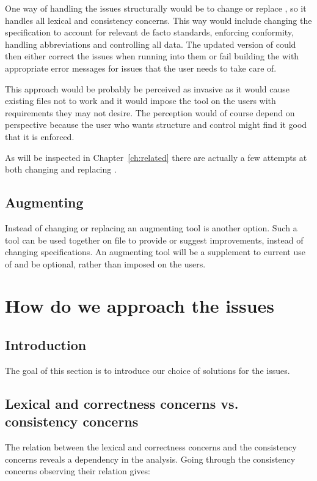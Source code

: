 One way of handling the issues structurally would be to change or
replace {\bibtex}, so it handles all lexical and consistency concerns.
This way would include changing the {\bibtex} specification to account
for relevant de facto standards, enforcing conformity, handling
abbreviations and controlling all data.  The updated version of
{\bibtex} could then either correct the issues when running into them
or fail building the  with appropriate error messages for
issues that the user needs to take care of.

This approach would be probably be perceived as invasive as it would
cause existing {\bibtex} files not to work and it would impose the
tool on the users with requirements they may not desire.  The
perception would of course depend on perspective because the user who
wants structure and control might find it good that it is enforced.

As will be inspected in Chapter~\ref{ch:related} there are actually a
few attempts at both changing and replacing {\bibtex}.


\subsection{Augmenting {\bibtex}}

Instead of changing or replacing {\bibtex} an augmenting tool is
another option.  Such a tool can be used together on {\bibtex} file
to provide or suggest improvements, instead of changing specifications.
An augmenting tool will be a supplement to current use of {\bibtex}
and be optional, rather than imposed on the users.


\section{How do we approach the {\bibtex} issues}
\subsection{Introduction}

The goal of this section is to introduce our choice of solutions for
the issues.


\subsection{Lexical and correctness concerns vs. consistency concerns}
\label{sec:approach_lexical_consistency}

The relation between the lexical and correctness concerns and the
consistency concerns reveals a dependency in the analysis.  Going
through the consistency concerns observing their relation gives:

